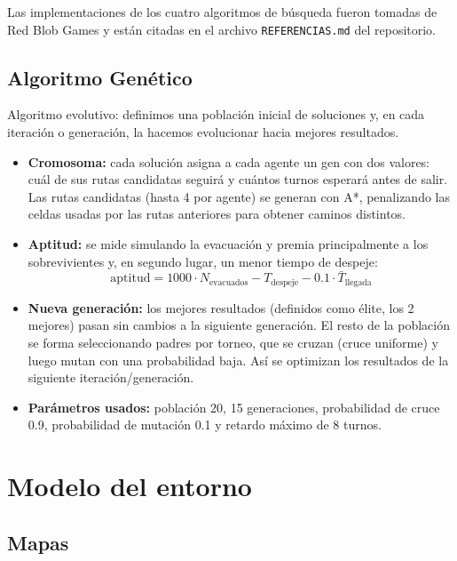 \documentclass[11pt,a4paper]{article}
\begin{document}
Las implementaciones de los cuatro algoritmos de búsqueda fueron tomadas de Red Blob Games \cite{redblob-impl,redblob-intro} y están citadas en el archivo \texttt{REFERENCIAS.md} del repositorio.

\subsection*{Algoritmo Genético}

Algoritmo evolutivo: definimos una población inicial de soluciones y, en cada iteración o generación, la hacemos evolucionar hacia mejores resultados.

\begin{itemize}
    \item \textbf{Cromosoma:} cada solución asigna a cada agente un gen con dos valores: cuál de sus rutas candidatas seguirá y cuántos turnos esperará antes de salir. Las rutas candidatas (hasta 4 por agente) se generan con A*, penalizando las celdas usadas por las rutas anteriores para obtener caminos distintos.
    \item \textbf{Aptitud:} se mide simulando la evacuación y premia principalmente a los sobrevivientes y, en segundo lugar, un menor tiempo de despeje:
    \begin{equation}
        \text{aptitud} = 1000 \cdot N_{\text{evacuados}} - T_{\text{despeje}} - 0.1 \cdot \bar{T}_{\text{llegada}}
    \end{equation}
    \item \textbf{Nueva generación:} los mejores resultados (definidos como élite, los 2 mejores) pasan sin cambios a la siguiente generación. El resto de la población se forma seleccionando padres por torneo, que se cruzan (cruce uniforme) y luego mutan con una probabilidad baja. Así se optimizan los resultados de la siguiente iteración/generación.
    \item \textbf{Parámetros usados:} población 20, 15 generaciones, probabilidad de cruce 0.9, probabilidad de mutación 0.1 y retardo máximo de 8 turnos.
\end{itemize}

\section{Modelo del entorno}

\subsection{Mapas}
\end{document}
